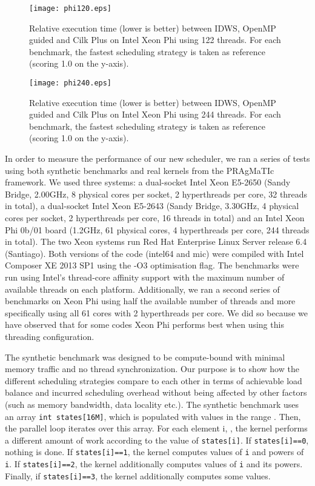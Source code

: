 \documentclass{acm_proc_article-sp}
\newcommand{\PRAGMATIC}{PRAgMaTIc\xspace}
\begin{document}
\begin{figure}[h]
\begin{center}
\texttt{[image: phi120.eps]}
\caption{Relative execution time (lower is better) between IDWS, OpenMP guided
and Cilk Plus on Intel Xeon Phi using 122 threads. For each benchmark, the
fastest scheduling strategy is taken as reference (scoring 1.0 on the y-axis).}
\label{fig:phi_120}
\end{center}
\end{figure}

\begin{figure}[h]
\begin{center}
\texttt{[image: phi240.eps]}
\caption{Relative execution time (lower is better) between IDWS, OpenMP guided
and Cilk Plus on Intel Xeon Phi using 244 threads. For each benchmark, the
fastest scheduling strategy is taken as reference (scoring 1.0 on the y-axis).}
\label{fig:phi_240}
\end{center}
\end{figure}

In order to measure the performance of our new scheduler, we ran a series of
tests using both synthetic benchmarks and real kernels from the \PRAGMATIC
framework. We used three systems: a dual-socket Intel Xeon E5-2650 (Sandy
Bridge, 2.00GHz, 8 physical cores per socket, 2 hyperthreads per core, 32
threads in total), a dual-socket Intel Xeon E5-2643 (Sandy Bridge, 3.30GHz, 4
physical cores per socket, 2 hyperthreads per core, 16 threads in total) and an
Intel Xeon Phi 0b/01 board (1.2GHz, 61 physical cores, 4 hyperthreads per core,
244 threads in total). The two Xeon systems run Red Hat Enterprise Linux Server
release 6.4 (Santiago). Both versions of the code (intel64 and mic) were
compiled with Intel Composer XE 2013 SP1 using the -O3 optimisation flag. The
benchmarks were run using Intel's thread-core affinity support with the maximum
number of available threads on each platform. Additionally, we ran a second
series of benchmarks on Xeon Phi using half the available number of threads and
more specifically using all 61 cores with 2 hyperthreads per core. We did so
because we have observed that for some codes Xeon Phi performs best when using
this threading configuration.

The synthetic benchmark was designed to be compute-bound with minimal memory
traffic and no thread synchronization. Our purpose is to show how the different
scheduling strategies compare to each other in terms of achievable load balance
and incurred scheduling overhead without being affected by other factors (such
as memory bandwidth, data locality etc.). The synthetic benchmark uses an array
\mbox{\texttt{int states[16M]}}, which is populated with values in the range
. Then, the parallel loop iterates over this array. For each element i,
, the kernel performs a different amount of work according to
the value of \texttt{states[i]}. If \texttt{states[i]==0}, nothing is done. If
\texttt{states[i]==1}, the kernel computes  values of \texttt{i} and
powers of \texttt{i}. If \texttt{states[i]==2}, the kernel additionally computes
 values of \texttt{i} and its powers. Finally, if \texttt{states[i]==3},
the kernel additionally computes some  values.
\end{document}

